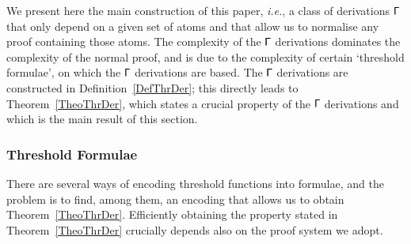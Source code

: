 
We present here the main construction of this paper, \emph{i.e.}, a class of derivations $\mathsf\Gamma$ that only depend on a given set of atoms and that allow us to normalise any proof containing those atoms. The complexity of the $\mathsf\Gamma$ derivations dominates the complexity of the normal proof, and is due to the complexity of certain `threshold formulae', on which the $\mathsf\Gamma$ derivations are based. The $\mathsf\Gamma$ derivations are constructed in Definition~\ref{DefThrDer}; this directly leads to Theorem~\ref{TheoThrDer}, which states a crucial property of the $\mathsf\Gamma$ derivations and which is the main result of this section.

\subsubsection{Threshold Formulae}




There are several ways of encoding threshold functions into formulae, and the problem is to find, among them, an encoding that allows us to obtain Theorem~\ref{TheoThrDer}. Efficiently obtaining the property stated in Theorem~\ref{TheoThrDer} crucially depends also on the proof system we adopt.


